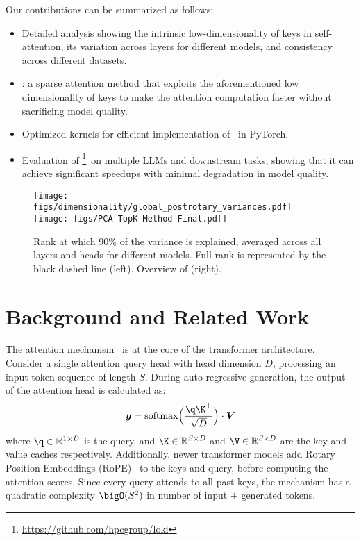 Our contributions can be summarized as follows:
\vspace{-0.1in}
\begin{itemize}
    \item Detailed analysis showing the intrinsic low-dimensionality of keys in
self-attention, its variation across layers for different models, and
consistency across different datasets.
    \item \method: a sparse attention method that exploits the aforementioned
low dimensionality of keys to make the attention computation faster without sacrificing
model quality.
    \item Optimized kernels for efficient implementation of \method~in PyTorch.
    \item Evaluation of
\method\footnote{\url{https://github.com/hpcgroup/loki}}~on multiple LLMs and
downstream tasks, showing that it can achieve significant speedups with minimal
degradation in model quality.
\end{itemize} 

\begin{figure}[t]
  \centering
  \texttt{[image: figs/dimensionality/global\_postrotary\_variances.pdf]}
  \hfill
  \texttt{[image: figs/PCA-TopK-Method-Final.pdf]}
  \caption{Rank at which 90\% of the variance is explained, averaged across all
layers and heads for different models. Full rank is represented by the black
dashed line (left). Overview of \method (right).}
  \label{fig:overview}
\end{figure}

\section{Background and Related Work}
\label{sec:bg}
The attention mechanism~\citep{transformer} is at the core of the transformer
architecture. Consider a single attention query head with head dimension
$D$, processing an input token sequence of length $S$. During auto-regressive
generation, the output of the attention head is calculated as:
\begin{equation}
    \label{eq:attention}
    \boldsymbol{y} = \mathrm{softmax}\Bigl(\dfrac{\q\K^\top}{\sqrt{D}}\Bigr) \cdot \boldsymbol{V}
\end{equation}
where $\q \in \mathbb{R}^{1\times D}$ is the query, and $\K \in \mathbb{R}^{S
\times D}$ and $\V \in \mathbb{R}^{S \times D}$ are the key and value caches
respectively. Additionally, newer transformer models add Rotary Position
Embeddings (RoPE)~\citep{su2023roformer} to the keys and query, before
computing the attention scores.  Since every query attends to all past keys,
the mechanism has a quadratic complexity $\bigO(S^2)$ in number of input $+$
generated tokens.


